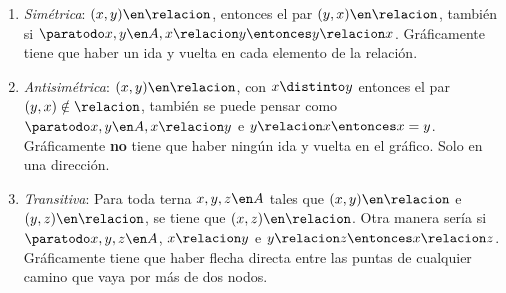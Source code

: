 \begin{itemize}[label={\tiny{}}]
\begin{enumerate}[label=\tiny\faIcon{poop}]
          \item  \textit{Simétrica}: $(x, y) \en \relacion$, entonces el par $(y, x) \en \relacion$,
                también si $\paratodo x, y \en A, x\relacion y \entonces y \relacion x$.
                Gráficamente tiene que haber un ida y vuelta en cada elemento de la relación.

          \item  \textit{Antisimétrica}: $(x, y) \en \relacion$, con $x \distinto y$ entonces el par $(y, x) \notin \relacion$, también se puede pensar
                como $\paratodo x,y \en A, x\relacion y$ e $ y \relacion x \entonces x = y$.
                Gráficamente \textbf{no} tiene que haber ningún ida y vuelta en el gráfico. Solo en una dirección.

          \item  \textit{Transitiva}: Para toda terna $x, y, z \en A$ tales que $(x, y) \en \relacion$ e $(y,z) \en \relacion$,
                se tiene que $(x, z) \en \relacion$.
                Otra manera sería si $\paratodo x, y, z \en A$, $x \relacion y$ e $y \relacion z \entonces x\relacion z$.
                Gráficamente tiene que haber flecha directa entre las puntas de cualquier camino que vaya por más de dos nodos.
\end{enumerate}
\end{itemize}
